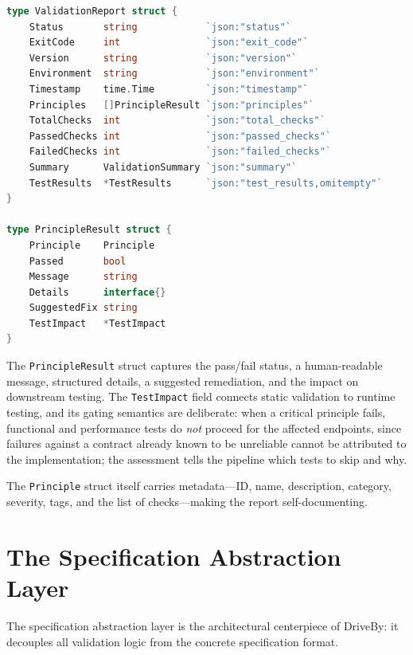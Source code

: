 \begin{lstlisting}[language=Go,float=htbp,caption={ValidationReport and PrincipleResult (\texttt{types/report.go}).},label={lst:report}]
type ValidationReport struct {
    Status       string            `json:"status"`
    ExitCode     int               `json:"exit_code"`
    Version      string            `json:"version"`
    Environment  string            `json:"environment"`
    Timestamp    time.Time         `json:"timestamp"`
    Principles   []PrincipleResult `json:"principles"`
    TotalChecks  int               `json:"total_checks"`
    PassedChecks int               `json:"passed_checks"`
    FailedChecks int               `json:"failed_checks"`
    Summary      ValidationSummary `json:"summary"`
    TestResults  *TestResults      `json:"test_results,omitempty"`
}

type PrincipleResult struct {
    Principle    Principle
    Passed       bool
    Message      string
    Details      interface{}
    SuggestedFix string
    TestImpact   *TestImpact
}
\end{lstlisting}

The \texttt{PrincipleResult} struct captures the pass/fail status, a human-readable message, structured details, a suggested remediation, and the impact on downstream testing. The \texttt{TestImpact} field connects static validation to runtime testing, and its gating semantics are deliberate: when a critical principle fails, functional and performance tests do \emph{not} proceed for the affected endpoints, since failures against a contract already known to be unreliable cannot be attributed to the implementation; the assessment tells the pipeline which tests to skip and why.

The \texttt{Principle} struct itself carries metadata---ID, name, description, category, severity, tags, and the list of checks---making the report self-documenting.

\section{The Specification Abstraction Layer}
\label{sec:spec-abstraction}

The specification abstraction layer is the architectural centerpiece of DriveBy: it decouples all validation logic from the concrete specification format.

